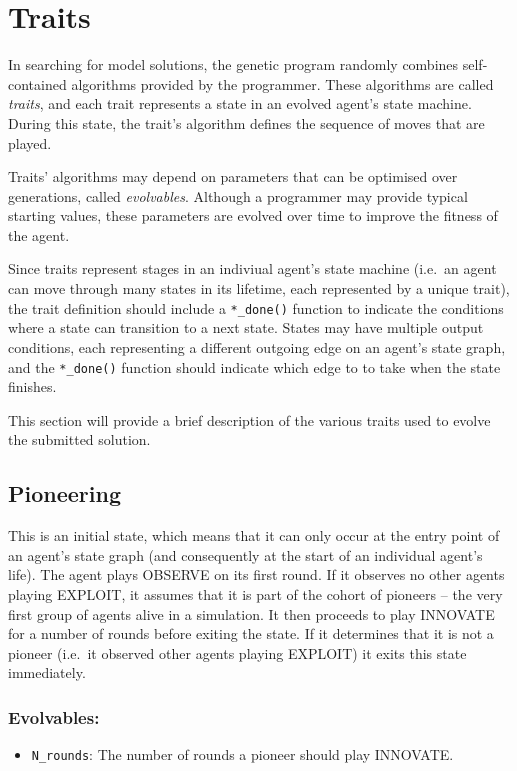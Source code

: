 \documentclass[a4paper,10pt]{article}
\begin{document}
\section{Traits}
In searching for model solutions, the genetic program randomly combines self-contained algorithms provided by
the programmer. These algorithms are called \emph{traits}, and each trait represents a state in an evolved agent's
state machine. During this state, the trait's algorithm defines the sequence of moves that are played.

Traits' algorithms may depend on parameters that can be optimised over generations, called \emph{evolvables}.
Although a programmer may provide typical starting values, these parameters are evolved over time to improve
the fitness of the agent.

Since traits represent stages in an indiviual agent's state machine (i.e.\ an agent can move through many states in its
lifetime, each represented by a unique trait), the trait definition should include a \texttt{*\_done()} function
to indicate the conditions where a state can transition to a next state. States may have multiple output
conditions, each representing a different outgoing edge on an agent's state graph, and the \texttt{*\_done()}
function should indicate which edge to to take when the state finishes.

This section will provide a brief description of the various traits used to evolve the submitted solution.

\subsection{Pioneering}
This is an initial state, which means that it can only occur at the entry point of an agent's state graph
(and consequently at the start of an individual agent's life). The agent plays OBSERVE on its first round.
If it observes no other agents playing EXPLOIT, it assumes that it is part of the cohort of pioneers --
the very first group of agents alive in a simulation. It then proceeds to play INNOVATE for a number of
rounds before exiting the state. If it determines that it is not a pioneer (i.e.\ it observed other agents
playing EXPLOIT) it exits this state immediately.

\subsubsection*{Evolvables:}
\begin{itemize}
 \item \texttt{N\_rounds}: The number of rounds a pioneer should play INNOVATE.
\end{itemize}
\end{document}
